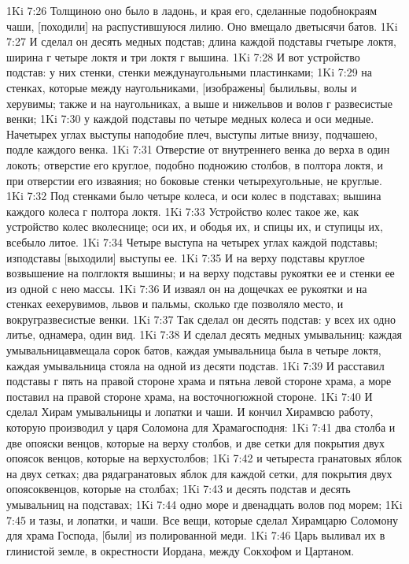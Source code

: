 1Ki 7:26  Толщиною оно было в ладонь, и края его, сделанные подобнокраям чаши, [походили] на распустившуюся лилию. Оно вмещало дветысячи батов.
1Ki 7:27  И сделал он десять медных подстав; длина каждой подставы гчетыре локтя, ширина г четыре локтя и три локтя г вышина.
1Ki 7:28  И вот устройство подстав: у них стенки, стенки междунаугольными пластинками;
1Ki 7:29  на стенках, которые между наугольниками, [изображены] былильвы, волы и херувимы; также и на наугольниках, а выше и нижельвов и волов г развесистые венки;
1Ki 7:30  у каждой подставы по четыре медных колеса и оси медные. Начетырех углах выступы наподобие плеч, выступы литые внизу, подчашею, подле каждого венка.
1Ki 7:31  Отверстие от внутреннего венка до верха в один локоть; отверстие его круглое, подобно подножию столбов, в полтора локтя, и при отверстии его изваяния; но боковые стенки четырехугольные, не круглые.
1Ki 7:32  Под стенками было четыре колеса, и оси колес в подставах; вышина каждого колеса г полтора локтя.
1Ki 7:33  Устройство колес такое же, как устройство колес вколеснице; оси их, и ободья их, и спицы их, и ступицы их, всебыло литое.
1Ki 7:34  Четыре выступа на четырех углах каждой подставы; изподставы [выходили] выступы ее.
1Ki 7:35  И на верху подставы круглое возвышение на полглоктя вышины; и на верху подставы рукоятки ее и стенки ее из одной с нею массы.
1Ki 7:36  И изваял он на дощечках ее рукоятки и на стенках еехерувимов, львов и пальмы, сколько где позволяло место, и вокругразвесистые венки.
1Ki 7:37  Так сделал он десять подстав: у всех их одно литье, однамера, один вид.
1Ki 7:38  И сделал десять медных умывальниц: каждая умывальницавмещала сорок батов, каждая умывальница была в четыре локтя, каждая умывальница стояла на одной из десяти подстав.
1Ki 7:39  И расставил подставы г пять на правой стороне храма и пятьна левой стороне храма, а море поставил на правой стороне храма, на восточногюжной стороне.
1Ki 7:40  И сделал Хирам умывальницы и лопатки и чаши. И кончил Хирамвсю работу, которую производил у царя Соломона для Храмагосподня:
1Ki 7:41  два столба и две опояски венцов, которые на верху столбов, и две сетки для покрытия двух опоясок венцов, которые на верхустолбов;
1Ki 7:42  и четыреста гранатовых яблок на двух сетках; два рядагранатовых яблок для каждой сетки, для покрытия двух опоясоквенцов, которые на столбах;
1Ki 7:43  и десять подстав и десять умывальниц на подставах;
1Ki 7:44  одно море и двенадцать волов под морем;
1Ki 7:45  и тазы, и лопатки, и чаши. Все вещи, которые сделал Хирамцарю Соломону для храма Господа, [были] из полированной меди.
1Ki 7:46  Царь выливал их в глинистой земле, в окрестности Иордана, между Сокхофом и Цартаном.

